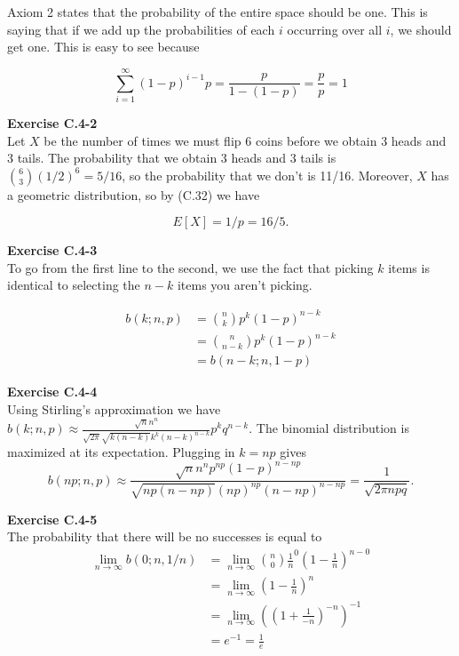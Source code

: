 \documentclass{article}
\begin{document}
Axiom 2 states that the probability of the entire space should be one. This is saying that if we add up the probabilities of each $i$ occurring over all $i$, we should get one. This is easy to see because

\[
\sum_{i=1}^{\infty} (1-p)^{i-1} p = \frac{p}{1-(1-p)} = \frac{p}{p} = 1
\]

\noindent\textbf{Exercise C.4-2}\\

Let $X$ be the number of times we must flip 6 coins before we obtain 3 heads and 3 tails.  The probability that we obtain 3 heads and 3 tails is ${6 \choose 3}(1/2)^6 = 5/16$, so the probability that we don't is 11/16.  Moreover, $X$ has a geometric distribution, so by (C.32) we have

\[ E[X] = 1/p = 16/5.\]

\noindent\textbf{Exercise C.4-3}\\

To go from the first line to the second, we use the fact that picking $k$ items is identical to selecting the $n-k$ items you aren't picking.

\begin{align*}
b(k;n,p) &= \binom{n}{k} p^k (1-p)^{n-k}\\
&= \binom{n}{n-k}p^{k}(1-p)^{n-k}\\
&= b(n-k;n,1-p)
\end{align*}

\noindent\textbf{Exercise C.4-4}\\

Using Stirling's approximation we have $b(k;n,p) \approx \frac{\sqrt{n}n^n}{\sqrt{2\pi}\sqrt{k(n-k)}k^k(n-k)^{n-k}}p^kq^{n-k}$.  The binomial distribution is maximized at its expectation.  Plugging in $k=np$ gives 
\[ b(np;n,p) \approx \frac{\sqrt{n}n^np^{np}(1-p)^{n-np}}{\sqrt{np(n-np)}(np)^{np}(n-np)^{n-np}} = \frac{1}{\sqrt{2\pi n p q}}.\]


\noindent\textbf{Exercise C.4-5}\\

The probability that there will be no successes is equal to 
\begin{align*}
\lim_{n\rightarrow\infty}b(0;n,1/n) &= \lim_{n\rightarrow \infty} \binom{n}{0} \frac{1}{n}^0 (1- \frac{1}{n})^{n-0}\\
 &= \lim_{n\rightarrow\infty}(1-\frac{1}{n})^n\\
 &= \lim_{n\rightarrow\infty} ((1 + \frac{1}{-n})^{-n})^{-1}\\
 &= e^{-1} = \frac{1}{e}
\end{align*}
\end{document}
